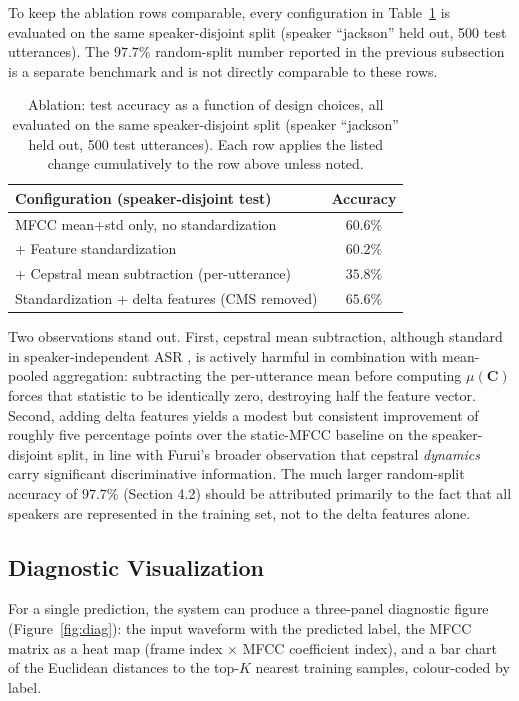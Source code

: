 \documentclass[12pt,a4paper]{article}
\begin{document}
To keep the ablation rows comparable, every configuration in
Table~\ref{tab:ablation} is evaluated on the same speaker-disjoint split
(speaker ``jackson'' held out, 500 test utterances). The $97.7\%$
random-split number reported in the previous subsection is a separate
benchmark and is not directly comparable to these rows.

\begin{table}[H]
\centering
\caption{Ablation: test accuracy as a function of design choices, all evaluated on the same speaker-disjoint split (speaker ``jackson'' held out, 500 test utterances). Each row applies the listed change cumulatively to the row above unless noted.}
\label{tab:ablation}
\begin{tabular}{lc}
\toprule
\textbf{Configuration (speaker-disjoint test)} & \textbf{Accuracy} \\
\midrule
MFCC mean+std only, no standardization & $60.6\%$ \\
+ Feature standardization & $60.2\%$ \\
+ Cepstral mean subtraction (per-utterance) & $35.8\%$ \\
Standardization + delta features (CMS removed) & $\mathbf{65.6\%}$ \\
\bottomrule
\end{tabular}
\end{table}

Two observations stand out. First, cepstral mean subtraction, although
standard in speaker-independent ASR \cite{furui1986speaker}, is actively
harmful in combination with mean-pooled aggregation: subtracting the
per-utterance mean before computing $\mu(\mathbf{C})$ forces that statistic
to be identically zero, destroying half the feature vector. Second, adding
delta features yields a modest but consistent improvement of roughly five
percentage points over the static-MFCC baseline on the speaker-disjoint
split, in line with Furui's broader observation \cite{furui1986speaker}
that cepstral \emph{dynamics} carry significant discriminative information.
The much larger random-split accuracy of $97.7\%$ (Section 4.2) should be
attributed primarily to the fact that all speakers are represented in the
training set, not to the delta features alone.

\subsection{Diagnostic Visualization}

For a single prediction, the system can produce a three-panel diagnostic
figure (Figure~\ref{fig:diag}): the input waveform with the predicted label,
the MFCC matrix as a heat map (frame index $\times$ MFCC coefficient
index), and a bar chart of the Euclidean distances to the top-$K$ nearest
training samples, colour-coded by label.
\end{document}
